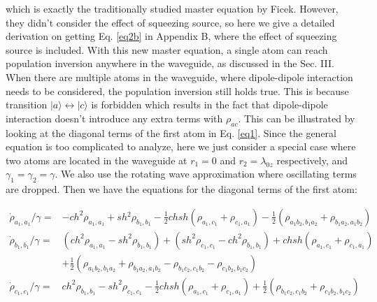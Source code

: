 \documentclass[aps,showpacs,twocolumn,twoside,groupedaddress]{revtex4}
\begin{document}
which is exactly the traditionally studied master equation\cite{tanas2004stationary} by Ficek. However, they didn't consider the effect of squeezing source, so here we give a detailed derivation on getting Eq. \eqref{eq2b} in Appendix B, where the effect of squeezing source is included. With this new master equation, a single atom can reach population inversion anywhere in the waveguide, as discussed in the Sec. III. When there are multiple atoms in the waveguide, where dipole-dipole interaction needs to be considered, the population inversion still holds true. This is because transition $|a\rangle\leftrightarrow|c\rangle$ is forbidden which results in the fact that dipole-dipole interaction doesn't introduce any extra terms with $\rho_{ac}$. This can be illustrated by looking at the diagonal terms of the first atom in Eq. \eqref{eq1}. Since the general equation is too complicated to analyze, here we just consider a special case where two atoms are located in the waveguide at $r_1=0$ and $r_2=\lambda_{0z}$ respectively, and $\gamma_1=\gamma_2=\gamma$. We also use the rotating wave approximation where oscillating terms are dropped. Then we have the equations for the diagonal terms of the first atom:
\begin{widetext}
\begin{subequations}
\begin{align}
\dot{\rho}_{a_{1},a_{1}}/\gamma=&-ch^{2}\rho_{a_{1},a_{1}}+sh{}^{2}\rho_{b_{1},b_{1}}-\frac{1}{2}chsh(\rho_{a_{1},c_{1}}+\rho_{c_{1},a_{1}})-\frac{1}{2}(\rho_{a_{1}b_{2},b_{1}a_{2}}+\rho_{b_{1}a_{2},a_{1}b_{2}})\label{5a} \\
\dot{\rho}_{b_{1},b_{1}}/\gamma=&(ch^{2}\rho_{a_{1},a_{1}}-sh^{2}\rho_{b_{1},b_{1}})+(sh^{2}\rho_{c_{1},c_{1}}-ch^{2}\rho_{b_{1},b_{1}})+chsh(\rho_{a_{1},c_{1}}+\rho_{c_{1},a_{1}})\\
&+\frac{1}{2}(\rho_{a_{1}b_{2},b_{1}a_{2}}+\rho_{b_{1}a_{2},a_{1}b_{2}}-\rho_{b_{1}c_{2},c_{1}b_{2}}-\rho_{c_{1}b_{2},b_{1}c_{2}}) \label{5b}\\
\dot{\rho}_{c_{1},c_{1}}/\gamma=&ch^{2}\rho_{b_{1},b_{1}}-sh^{2}\rho_{c_{1},c_{1}}-\frac{1}{2}chsh(\rho_{a_{1},c_{1}}+\rho_{c_{1},a_{1}})+\frac{1}{2}(\rho_{b_{1}c_{2},c_{1}b_{2}}+\rho_{c_{1}b_{2},b_{1}c_{2}}) \label{5c}
\end{align}
\end{subequations}
\end{widetext}
\end{document}
